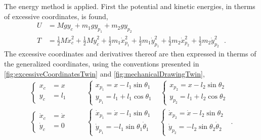 %
The energy method is applied. First the potential and kinetic energies, in therms of excessive coordinates, is found,
\begin{align}
  U &= M g y_c + m_1 g y_{p_1} + m_2 g y_{p_2}  \label{eq:potentialEnergyTwin}  \\
  T &= \tfrac{1}{2} M \dot{x}_c^2 + \tfrac{1}{2} M \dot{y}_c^2 + \tfrac{1}{2} m_1 \dot{x}_{p_1}^2  + \tfrac{1}{2} m_1 \dot{y}_{p_1}^2 + \tfrac{1}{2} m_2 \dot{x}_{p_2}^2 + \tfrac{1}{2} m_2 \dot{y}_{p_2}^2 \label{eq:kineticEnergyTwin} \ \ \ .
\end{align}
%
The excessive coordinates and derivatives thereof are then expressed in therms of the generalized coordinates, using the conventions presented in \autoref{fig:excessiveCoordinatesTwin} and \ref{fig:mechanicalDrawingTwin},
\begin{align}
  \begin{cases}
    x_c &=  x  \\
    y_c &=  l_1  
  \end{cases} &
  \hspace{20pt}
  \begin{cases}
    x_{p_1} =  x   - l_1 \sin \theta_1 \\
    y_{p_1} =  l_1 + l_1 \cos \theta_1
  \end{cases}
  \hspace{10pt}
  \begin{cases}
    x_{p_2} =  x   - l_2 \sin \theta_2 \\
    y_{p_2} =  l_1 + l_2 \cos \theta_2
  \end{cases}
  \label{eq:excessiveToGeneralized} \\
  \begin{cases}
    \dot{x}_c &=  \dot{x}  \\
    \dot{y}_c &=  0  
  \end{cases} &
  \hspace{20pt}
  \begin{cases}
    \dot{x}_{p_1} =  \dot{x} - l_1 \sin \theta_1 \\
    \dot{y}_{p_1} =  -l_1 \sin \theta_1 \dot{\theta}_1
  \end{cases}
  \hspace{10pt}
  \begin{cases}
    \dot{x}_{p_2} = \dot{x} - l_2 \sin \theta_2 \\
    \dot{y}_{p_2} = -l_2 \sin \theta_2 \dot{\theta}_2
  \end{cases}  \ \ \ .
  \label{eq:excessiveToGeneralizedDerivatives}
\end{align}

